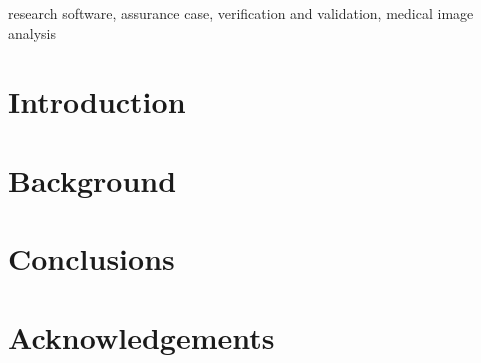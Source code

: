\documentclass[conference]{IEEEtran}
\begin{document}
\begin{IEEEkeywords}
research software, assurance case, verification and validation, medical image
analysis
\end{IEEEkeywords}

\section{Introduction}


\section{Background} \label{Sec_Background}


\section{Conclusions} \label{Sec_Conclusions}


\section*{Acknowledgements}

% 
%  
\end{document}
